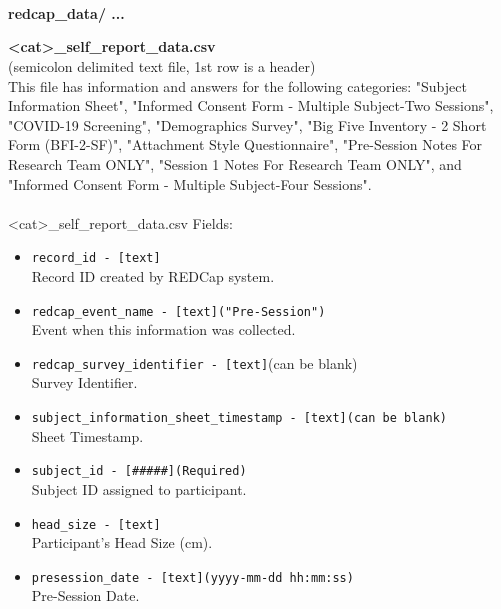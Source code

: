 \begin{description}
\begin{addmargin}[0em]{0em}
\end{addmargin} %



\textbf{\\\\\\}
\begin{addmargin}[0em]{0em} %
    \textbf{redcap\_data/ ... }

    \begin{addmargin}[1em]{0em} %
        \label{<cat>_self_report_data.csv}
        \textbf{<cat>\_self\_report\_data.csv}\\(semicolon delimited text file, 1st row is a header)\\
        This file has information and answers for the following categories: "Subject Information Sheet",
        "Informed Consent Form - Multiple Subject-Two Sessions", "COVID-19 Screening", "Demographics Survey",
        "Big Five Inventory - 2 Short Form (BFI-2-SF)", "Attachment Style Questionnaire",
        "Pre-Session Notes For Research Team ONLY", "Session 1 Notes For Research Team ONLY",
        and "Informed Consent Form - Multiple Subject-Four Sessions".\\\\ 
        <cat>\_self\_report\_data.csv Fields:
        \begin{itemize}
            \item \verb|record_id - [text]|\\Record ID created by REDCap system.
            \item \verb|redcap_event_name - [text]("Pre-Session")|\\Event when this information was collected.
            \item \verb|redcap_survey_identifier - [text]|(can be blank)\\Survey Identifier.
            \item \verb|subject_information_sheet_timestamp - [text](can be blank)|\\Sheet Timestamp.
            \item \verb|subject_id - [#####](Required)|\\Subject ID assigned to participant.
            \item \verb|head_size - [text]|\\Participant's Head Size (cm).
            \item \verb|presession_date - [text](yyyy-mm-dd hh:mm:ss)|\\Pre-Session Date.

\end{itemize}
\end{addmargin}
\end{addmargin}
\end{description}
